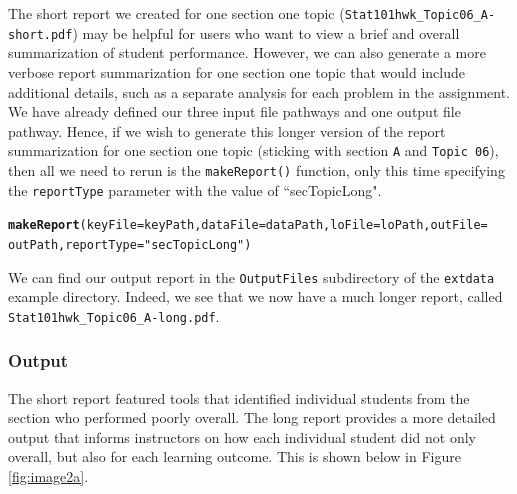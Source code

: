 \documentclass{article}\usepackage[]{graphicx}\usepackage[]{color}
\makeatletter
\newcommand{\hlstr}[1]{\textcolor[rgb]{0.192,0.494,0.8}{#1}}%
\newcommand{\hlstd}[1]{\textcolor[rgb]{0.345,0.345,0.345}{#1}}%
\newcommand{\hlkwc}[1]{\textcolor[rgb]{0.333,0.667,0.333}{#1}}%
\newcommand{\hlkwd}[1]{\textcolor[rgb]{0.737,0.353,0.396}{\textbf{#1}}}%
\newenvironment{kframe}{%
 \def\at@end@of@kframe{}%
 \ifinner\ifhmode%
  \def\at@end@of@kframe{\end{minipage}}%
  \begin{minipage}{\columnwidth}%
 \fi\fi%
 \def\FrameCommand##1{\hskip\@totalleftmargin \hskip-\fboxsep
 \colorbox{shadecolor}{##1}\hskip-\fboxsep
     \hskip-\linewidth \hskip-\@totalleftmargin \hskip\columnwidth}%
 \MakeFramed {\advance\hsize-\width
   \@totalleftmargin\z@ \linewidth\hsize
   \@setminipage}}%
 {\par\unskip\endMakeFramed%
 \at@end@of@kframe}
\newenvironment{knitrout}{}{} %
\numberwithin{equation}{section} %
\makeatother
\begin{document}
The short report we created for one section one topic (\texttt{Stat101hwk\_Topic06\_A-short.pdf}) may be helpful for users who want to view a brief and overall summarization of student performance. However, we can also generate a more verbose report summarization for one section one topic that would include additional details, such as a separate analysis for each problem in the assignment. We have already defined our three input file pathways and one output file pathway. Hence, if we wish to generate this longer version of the report summarization for one section one topic (sticking with section \texttt{A} and \texttt{Topic 06}), then all we need to rerun is the \texttt{makeReport()} function, only this time specifying the \texttt{reportType} parameter with the value of ``secTopicLong". \\

\begin{knitrout}
\color{fgcolor}\begin{kframe}
\begin{alltt}
\hlkwd{makeReport}\hlstd{(}\hlkwc{keyFile} \hlstd{= keyPath,} \hlkwc{dataFile} \hlstd{= dataPath,} \hlkwc{loFile} \hlstd{= loPath,} \hlkwc{outFile} \hlstd{=}
  \hlstd{outPath,} \hlkwc{reportType} \hlstd{=} \hlstr{"secTopicLong"}\hlstd{)}
\end{alltt}
\end{kframe}
\end{knitrout}

We can find our output report in the \texttt{OutputFiles} subdirectory of the \texttt{extdata} example directory. Indeed, we see that we now have a much longer report, called \texttt{Stat101hwk\_Topic06\_A-long.pdf}.

\subsubsection{Output}

The short report featured tools that identified individual students from the section who performed poorly overall. The long report provides a more detailed output that informs instructors on how each individual student did not only overall, but also for each learning outcome. This is shown below in Figure \ref{fig:image2a}.
\end{document}
